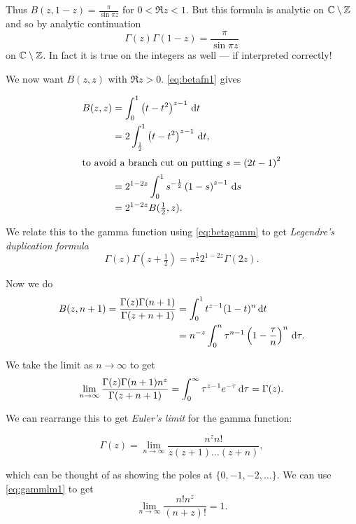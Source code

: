 \documentclass{notes}
\theoremstyle{plain}
\begin{document}
Thus $B(z,1-z) = \frac{\pi}{\sin \pi z}$ for $0 < \Re z < 1$.  But
this formula is analytic on $\mathbb{C} \setminus \mathbb{Z}$ and so by analytic
continuation
\begin{equation}\label{eq:gammprod}
\Gamma(z) \Gamma(1-z) = \frac{\pi}{\sin \pi z}
\end{equation}
on $\mathbb{C} \setminus \mathbb{Z}$.  In fact it is true on the integers as well --- if
interpreted correctly!

We now want $B(z,z)$ with $\Re z > 0$.  \eqref{eq:betafn1} gives

\begin{align*}
B(z,z) &= \int_0^1 \left(t - t^2 \right)^{z-1}\, \mathrm{d} t \\
& = 2 \int_{\frac{1}{2}}^1 \left(t - t^2 \right)^{z-1}\, \mathrm{d} t,\\
\intertext{to avoid a branch cut on putting $s = \left(2t - 1 \right)^2$}
&= 2^{1-2 z} \int_0^1 s^{-\frac{1}{2}} \left( 1-s\right)^{z-1}\, \mathrm{d} s \\
&= 2^{1-2z} B(\tfrac{1}{2},z).
\end{align*}

We relate this to the gamma function using \eqref{eq:betagamm} to get
\emph{Legendre's duplication formula}
\begin{equation}
\Gamma(z) \Gamma(z + \tfrac{1}{2}) = \pi^{\frac{1}{2}} 2^{1 - 2 z}
\Gamma(2 z).
\end{equation}

Now we do
\begin{align*}
B(z,n+1) = \frac{\Gamma(z) \Gamma(n+1)}{\Gamma(z+n+1)}
&= \int_0^1 t^{z-1} (1-t)^n\,\mathrm{d} t \\
&= n^{-z} \int_0^n \tau^{n-1} \left( 1- \frac{\tau}{n}\right)^n\, \mathrm{d} \tau.
\end{align*}

We take the limit as $n \to \infty$ to get
\begin{equation}\label{eq:gammlm1}
\lim_{n \to \infty} \frac{\Gamma(z) \Gamma(n+1) n^z}{\Gamma(z+n+1)} 
= \int_0^\infty \tau^{z-1} e^{- \tau}\, \mathrm{d} \tau = \Gamma(z).
\end{equation}

We can rearrange this to get \emph{Euler's limit} for the gamma function:

\begin{equation}\label{eq:eulim}
\Gamma(z) = \lim_{n \to \infty} \frac{n^z n!}{z (z+1) \dots (z+n)},
\end{equation}

which can be thought of as showing the poles at $\{ 0, -1, -2, \dots \}$.
We can use \eqref{eq:gammlm1} to get
\begin{equation}
\lim_{n \to \infty} \frac{n! n^z}{(n+z)!} = 1.
\end{equation}
\end{document}
